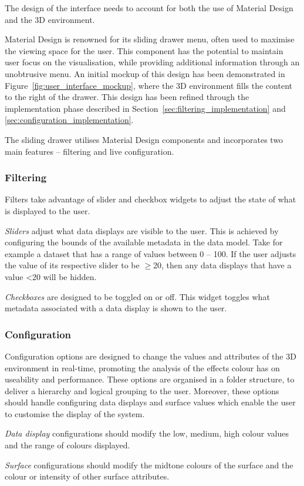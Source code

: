 {{		The design of the interface needs to account for both the use of Material Design and the 3D environment. 

		Material Design is renowned for its sliding drawer menu, often used to maximise the viewing space for the user. This component has the potential to maintain user focus on the visualisation, while providing additional information through an unobtrusive menu. An initial mockup of this design has been demonstrated in Figure~\ref{fig:user_interface_mockup}, where the 3D environment fills the content to the right of the drawer. This design has been refined through the implementation phase described in Section~\ref{sec:filtering_implementation} and \ref{sec:configuration_implementation}.

		

		The sliding drawer utilises Material Design components and incorporates two main features -- filtering and live configuration.

		\subsubsection{Filtering} {
		\label{sec:filtering}

			Filters take advantage of slider and checkbox widgets to adjust the state of what is displayed to the user.

			\emph{Sliders} adjust what data displays are visible to the user. This is achieved by configuring the bounds of the available metadata in the data model. Take for example a dataset that has a range of values between 0 -- 100. If the user adjusts the value of its respective slider to be $\ge$20, then any data displays that have a value \textless20 will be hidden.
			
			\emph{Checkboxes} are designed to be toggled on or off. This widget toggles what metadata associated with a data display is shown to the user.

		}

		\subsubsection{Configuration} {
		\label{sec:configuration}

			Configuration options are designed to change the values and attributes of the 3D environment in real-time, promoting the analysis of the effects colour has on useability and performance. These options are organised in a folder structure, to deliver a hierarchy and logical grouping to the user. Moreover, these options should handle configuring data displays and surface values which enable the user to customise the display of the system.

			\emph{Data display} configurations should modify the low, medium, high colour values and the range of colours displayed.

			\emph{Surface} configurations should modify the midtone colours of the surface and the colour or intensity of other surface attributes.

		}

	}

}

